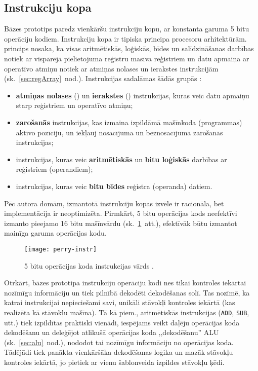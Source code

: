 \subsection{Instrukciju kopa} \label{sec:perry-instr}
	Bāzes prototips paredz vienkāršu instrukciju kopu, ar konstanta garuma
	5 bitu operāciju kodiem. Instrukciju kopa ir tipiska 
	principa procesoru arhitektūrām.  princips nosaka, ka
	visas aritmētiskās, loģiskās, bīdes un salīdzināšanas darbības notiek
	ar vispārējā pielietojuma reģistru masīva reģistriem un datu apmaiņa ar
	operatīvo atmiņu notiek ar atmiņas nolases un ierakstes instrukcijām
	\cite[11.~lpp.]{Flynn-arch}	(sk.~\ref{sec:regArray}~nod.).
	Instrukcijas sadalāmas šādās grupās \cite[291.~lpp.]{Perry-VHDL}:
	\begin{itemize}
		\item \textbf{atmiņas nolases} () un \textbf{ierakstes}
			() instrukcijas, kuras
			veic datu apmaiņu starp reģistriem un operatīvo atmiņu;
		\item \textbf{zarošanās} instrukcijas, kas izmaina
			izpildāmā mašīnkoda (programmas) aktīvo pozīciju, un iekļauj
			nosacījuma un beznosacījuma zarošanās instrukcijas;
		\item instrukcijas, kuras veic \textbf{aritmētiskās} un 
			\textbf{bitu loģiskās} darbības ar reģistriem (operandiem);
		\item instrukcijas, kuras veic \textbf{bitu bīdes} reģistra
			(operanda) datiem.
	\end{itemize}
	
	Pēc autora domām, izmantotā instrukciju kopas izvēle ir racionāla, bet
	implementācija ir neoptimizēta. Pirmkārt, 5 bitu operācijas kods
	neefektīvi izmanto pieejamo 16 bitu mašīnvārdu
	(sk.~\ref{fig:5bit-opcode}~att.), efektīvāk būtu izmantot mainīga
	garuma operācijas kodu.
	\begin{figure}[thb]
		\centering
		\texttt{[image: perry-instr]}
		\caption[5 bitu operācijas koda instrukcijas vārds.]
		        {5 bitu operācijas koda instrukcijas vārds \cite[292.~lpp.]{Perry-VHDL}.}
		\label{fig:5bit-opcode}
	\end{figure}
	
	Otrkārt, bāzes prototipa instrukciju operāciju kodi nes tikai kontroles
	iekārtai nozīmīgu informāciju un tiek pilnībā dekodēti dekodēšanas solī.
	Tas nozīmē, ka katrai instrukcijai nepieciešami savi, unikāli stāvokļi
	kontroles iekārtā (kas realizēta kā stāvokļu mašīna). Tā kā piem., 
	aritmētiskās instrukcijas (\texttt{ADD}, \texttt{SUB}, utt.)
	tiek izpildītas praktiski vienādi, iespējams veikt daļēju operācijas
	koda dekodēšanu un deleģējot atlikušā operācijas koda ,,dekodēšanu''
	ALU (sk.~\ref{sec:alu}~nod.), nododot tai nozīmīgu informāciju no
	operācijas koda. Tādējādi tiek panākta vienkāršāka dekodēšanas loģika un 
	mazāk stāvokļu kontroles iekārtā, jo pietiek ar vienu šablonveida
	izpildes stāvokļu ķēdi.
	
